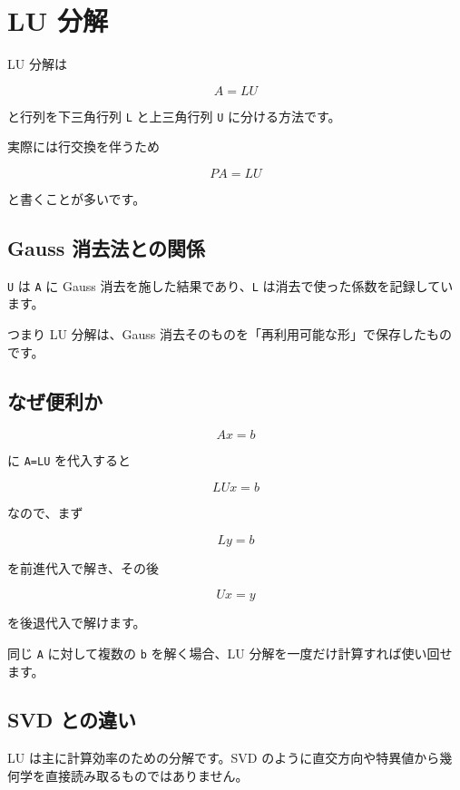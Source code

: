 \documentclass[
  11pt,
  a4paper,
]{ltjsarticle}
\author{}
\date{}
\begin{document}
\hypertarget{lu-ux5206ux89e3}{%
\section{LU 分解}\label{lu-ux5206ux89e3}}

LU 分解は

\[
A=LU
\]

と行列を下三角行列 \texttt{L} と上三角行列 \texttt{U} に分ける方法です。

実際には行交換を伴うため

\[
PA=LU
\]

と書くことが多いです。

\hypertarget{gauss-ux6d88ux53bbux6cd5ux3068ux306eux95a2ux4fc2}{%
\subsection{Gauss
消去法との関係}\label{gauss-ux6d88ux53bbux6cd5ux3068ux306eux95a2ux4fc2}}

\texttt{U} は \texttt{A} に Gauss 消去を施した結果であり、\texttt{L}
は消去で使った係数を記録しています。

つまり LU 分解は、Gauss
消去そのものを「再利用可能な形」で保存したものです。

\hypertarget{ux306aux305cux4fbfux5229ux304b}{%
\subsection{なぜ便利か}\label{ux306aux305cux4fbfux5229ux304b}}

\[
Ax=b
\]

に \texttt{A=LU} を代入すると

\[
LUx=b
\]

なので、まず

\[
Ly=b
\]

を前進代入で解き、その後

\[
Ux=y
\]

を後退代入で解けます。

同じ \texttt{A} に対して複数の \texttt{b} を解く場合、LU
分解を一度だけ計算すれば使い回せます。

\hypertarget{svd-ux3068ux306eux9055ux3044}{%
\subsection{SVD との違い}\label{svd-ux3068ux306eux9055ux3044}}

LU は主に計算効率のための分解です。SVD
のように直交方向や特異値から幾何学を直接読み取るものではありません。
\end{document}

